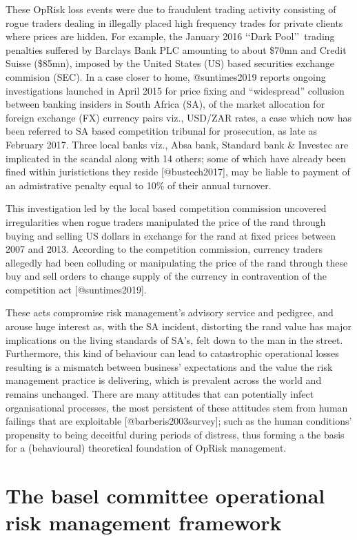 \documentclass[
]{article}
\begin{document}
These OpRisk loss events were due to fraudulent trading activity
consisting of rogue traders dealing in illegally placed high frequency
trades for private clients where prices are hidden. For example, the
January 2016 \lq\lq Dark Pool\rq\rq~trading penalties suffered by
Barclays Bank PLC amounting to about \$70mn and Credit Suisse (\$85mn),
imposed by the United States (US) based securities exchange commision
(SEC). In a case closer to home, @suntimes2019 reports ongoing
investigations launched in April 2015 for price fixing and
``widespread'' collusion between banking insiders in South Africa (SA),
of the market allocation for foreign exchange (FX) currency pairs viz.,
USD/ZAR rates, a case which now has been referred to SA based
competition tribunal for prosecution, as late as February 2017. Three
local banks viz., Absa bank, Standard bank \& Investec are implicated in
the scandal along with 14 others; some of which have already been fined
within juristictions they reside {[}@bustech2017{]}, may be liable to
payment of an admistrative penalty equal to 10\% of their annual
turnover.\medskip

This investigation led by the local based competition commission
uncovered irregularities when rogue traders manipulated the price of the
rand through buying and selling US dollars in exchange for the rand at
fixed prices between 2007 and 2013. According to the competition
commission, currency traders allegedly had been colluding or
manipulating the price of the rand through these buy and sell orders to
change supply of the currency in contravention of the competition act
{[}@suntimes2019{]}.\medskip

These acts compromise risk management's advisory service and pedigree,
and arouse huge interest as, with the SA incident, distorting the rand
value has major implications on the living standards of SA's, felt down
to the man in the street. Furthermore, this kind of behaviour can lead
to catastrophic operational losses resulting is a mismatch between
business' expectations and the value the risk management practice is
delivering, which is prevalent across the world and remains unchanged.
There are many attitudes that can potentially infect organisational
processes, the most persistent of these attitudes stem from human
failings that are exploitable {[}@barberis2003survey{]}; such as the
human conditions' propensity to being deceitful during periods of
distress, thus forming a the basis for a (behavioural) theoretical
foundation of OpRisk management.

\section{The basel committee operational risk management framework}
\label{sec:The basel committee operational risk management framework}
\end{document}
